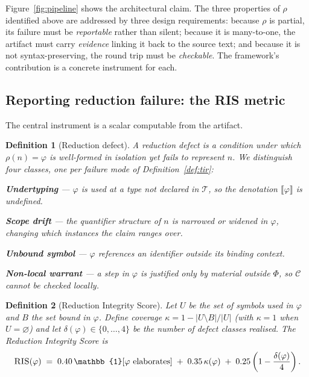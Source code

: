 \documentclass[11pt,a4paper]{article}
\theoremstyle{plain}
\newtheorem{definition}{Definition}
\theoremstyle{definition}
\newcommand{\RIS}{\textnormal{\textsc{RIS}}}
\begin{document}
Figure~\ref{fig:pipeline} shows the architectural claim. The three
properties of $\rho$ identified above are addressed by three design
requirements: because $\rho$ is partial, its failure must be
\emph{reportable} rather than silent; because it is many-to-one, the
artifact must carry \emph{evidence} linking it back to the source text; and
because it is not syntax-preserving, the round trip must be
\emph{checkable}. The framework's contribution is a concrete instrument for
each.

\subsection{Reporting reduction failure: the \RIS{} metric}
\label{sec:ir}

The central instrument is a scalar computable from the artifact.

\begin{definition}[Reduction defect]
\label{def:defect}
A \emph{reduction defect} is a condition under which $\rho(n)=\varphi$ is
well-formed in isolation yet fails to represent $n$. We distinguish four
classes, one per failure mode of Definition~\ref{def:tir}:
\begin{description}[leftmargin=2.2em,labelsep=0.5em]
\item[A.] \textbf{Undertyping} --- $\varphi$ is used at a type not declared
      in $\mathcal{T}$, so the denotation $\llbracket\varphi\rrbracket$ is
      undefined.
\item[B.] \textbf{Scope drift} --- the quantifier structure of $n$ is
      narrowed or widened in $\varphi$, changing which instances the claim
      ranges over.
\item[C.] \textbf{Unbound symbol} --- $\varphi$ references an identifier
      outside its binding context.
\item[D.] \textbf{Non-local warrant} --- a step in $\varphi$ is justified
      only by material outside $\Phi$, so $\mathcal{C}$ cannot be checked
      locally.
\end{description}
\end{definition}

\begin{definition}[Reduction Integrity Score]
\label{def:ris}
Let $U$ be the set of symbols used in $\varphi$ and $B$ the set bound in
$\varphi$. Define coverage $\kappa = 1 - \lvert U\setminus B\rvert/\lvert U\rvert$
(with $\kappa=1$ when $U=\varnothing$) and let
$\delta(\varphi)\in\{0,\dots,4\}$ be the number of defect classes realised.
The \emph{Reduction Integrity Score} is
\begin{equation}
\label{eq:ris}
\RIS(\varphi) \;=\; 0.40\,\mathbb{1}[\varphi \text{ elaborates}]
\;+\; 0.35\,\kappa(\varphi)
\;+\; 0.25\left(1 - \frac{\delta(\varphi)}{4}\right).
\end{equation}
\end{definition}
\end{document}
